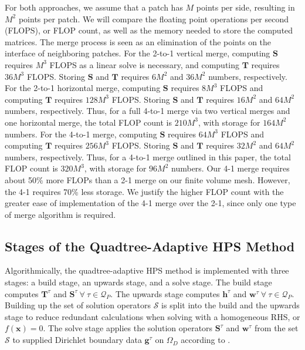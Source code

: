 For both approaches, we assume that a patch has $M$ points per side, resulting in $M^2$ points per patch. We will compare the floating point operations per second (FLOPS), or FLOP count, as well as the memory needed to store the computed matrices. The merge process is seen as an elimination of the points on the interface of neighboring patches. For the 2-to-1 vertical merge, computing $\mathbf{S}$ requires $M^3$ FLOPS as a linear solve is necessary, and computing $\mathbf{T}$ requires $36M^3$ FLOPS. Storing $\mathbf{S}$ and $\mathbf{T}$ requires $6M^2$ and $36M^2$ numbers, respectively. For the 2-to-1 horizontal merge, computing $\mathbf{S}$ requires $8M^3$ FLOPS and computing $\mathbf{T}$ requires $128M^3$ FLOPS. Storing $\mathbf{S}$ and $\mathbf{T}$ requires $16M^2$ and $64M^2$ numbers, respectively. Thus, for a full 4-to-1 merge via two vertical merges and one horizontal merge, the total FLOP count is $210M^3$, with storage for $164M^2$ numbers. For the 4-to-1 merge, computing $\mathbf{S}$ requires $64M^3$ FLOPS and computing $\mathbf{T}$ requires $256M^3$ FLOPS. Storing $\mathbf{S}$ and $\mathbf{T}$ requires $32M^2$ and $64M^2$ numbers, respectively. Thus, for a 4-to-1 merge outlined in this paper, the total FLOP count is $320M^3$, with storage for $96M^2$ numbers.  Our 4-1 merge requires about 50\% more FLOPs  than a 2-1 merge on our finite volume mesh.  However, the 4-1 requires 70\% less storage.  We justify the higher FLOP count with the greater ease of implementation of the 4-1 merge over the 2-1, since only one type of merge algorithm is required.  

\subsection{Stages of the Quadtree-Adaptive HPS Method}
\label{sub:stages-of-the-quadtree-adaptive-hps-method}

Algorithmically, the quadtree-adaptive HPS method is implemented with three stages: a build stage, an upwards stage, and a solve stage. The build stage computes $\textbf{T}^{\tau}$ and $\textbf{S}^{\tau}\ \forall\ \tau \in \mathcal{Q}_P$. The upwards stage computes $\textbf{h}^{\tau}$ and $\textbf{w}^{\tau}\ \forall\ \tau \in \mathcal{Q}_P$. Building up the set of solution operators $\mathcal{S}$ is split into the build and the upwards stage to reduce redundant calculations when solving  with a homogeneous RHS, or $f(\textbf{x}) = 0$. The solve stage applies the solution operators $\textbf{S}^{\tau}$ and $\textbf{w}^{\tau}$ from the set $\mathcal{S}$ to supplied  Dirichlet boundary data $\textbf{g}^{\tau}$ on $\Omega_D$  according to .

